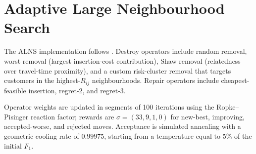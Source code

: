 \section{Adaptive Large Neighbourhood Search}
\label{ch5:alns}

The ALNS implementation follows \citet{ropke2006}. Destroy operators
include random removal, worst removal (largest insertion-cost
contribution), Shaw removal (relatedness over travel-time
proximity), and a custom risk-cluster removal that targets customers
in the highest-$R_{ij}$ neighbourhoods. Repair operators include
cheapest-feasible insertion, regret-2, and regret-3.

Operator weights are updated in segments of 100 iterations using the
Ropke--Pisinger reaction factor; rewards are
$\sigma = (33, 9, 1, 0)$ for new-best, improving, accepted-worse, and
rejected moves. Acceptance is simulated annealing with a geometric
cooling rate of $0.99975$, starting from a temperature equal to $5\%$
of the initial $F_1$.


